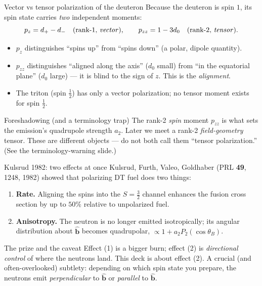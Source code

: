 \documentclass[aspectratio=169]{beamer}
\newcommand{\bb}{\hat{\bm b}}
\begin{document}
\begin{frame}[t]{Vector vs tensor polarization of the deuteron}
Because the deuteron is spin $1$, its spin state carries \emph{two} independent moments:
\[
p_z = d_+ - d_-\quad(\text{rank-1, \emph{vector}}),
\qquad
p_{zz} = 1 - 3 d_0 \quad(\text{rank-2, \emph{tensor}}).
\]
\begin{itemize}
  \item $p_z$ distinguishes ``spins up'' from ``spins down'' (a polar, dipole quantity).
  \item $p_{zz}$ distinguishes ``aligned along the axis'' ($d_0$ small) from ``in the equatorial plane'' ($d_0$ large) --- it is blind to the sign of $z$. This is the \emph{alignment}.
  \item The triton (spin $\tfrac12$) has only a vector polarization; no tensor moment exists for spin $\tfrac12$.
\end{itemize}
\begin{block}{Foreshadowing (and a terminology trap)}
The rank-2 \emph{spin} moment $p_{zz}$ is what sets the emission's quadrupole strength $a_2$. Later we meet a rank-2 \emph{field-geometry} tensor. \alert{These are different objects} --- do not both call them ``tensor polarization.'' (See the terminology-warning slide.)
\end{block}
\end{frame}

\begin{frame}[t]{Kulsrud 1982: two effects at once}
Kulsrud, Furth, Valeo, Goldhaber (PRL \textbf{49}, 1248, 1982) showed that polarizing DT fuel does two things:
\begin{enumerate}
  \item \textbf{Rate.} Aligning the spins into the $S=\tfrac32$ channel enhances the fusion cross section by up to $50\%$ relative to unpolarized fuel.
  \item \textbf{Anisotropy.} The neutron is no longer emitted isotropically; its angular distribution about $\bb$ becomes quadrupolar, $\propto 1 + a_2 P_2(\cos\theta_B)$.
\end{enumerate}
\vspace{0.4em}
\begin{block}{The prize and the caveat}
Effect (1) is a bigger burn; effect (2) is \emph{directional control} of where the neutrons land. This deck is about effect (2). A crucial (and often-overlooked) subtlety: depending on which spin state you prepare, the neutrons emit \emph{perpendicular} to $\bb$ or \emph{parallel} to $\bb$.
\end{block}
\end{frame}
\end{document}
